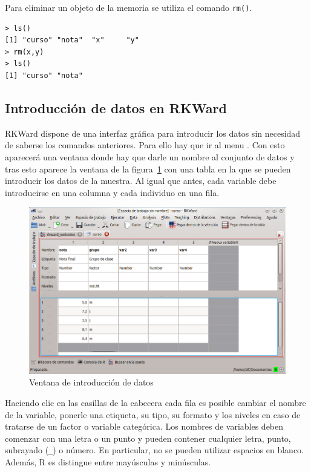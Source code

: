 Para eliminar un objeto de la memoria se utiliza el comando \lstinline{rm()}.
\begin{lstlisting}
> ls()
[1] "curso" "nota"  "x"     "y"    
> rm(x,y)
> ls()
[1] "curso" "nota"
\end{lstlisting}


\subsection{Introducción de datos en RKWard}
RKWard dispone de una interfaz gráfica para introducir los datos sin necesidad de saberse los comandos anteriores.
Para ello hay que ir al menu . Con esto
aparecerá una ventana donde hay que darle un nombre al conjunto de datos y tras esto aparece la ventana de la
figura~\ref{g:matriz_datos} con una tabla en la que se pueden introducir los datos de la muestra.
Al igual que antes, cada variable debe introducirse en una columna y cada individuo en una fila.

\begin{figure}[htp]
\begin{center}
  \includegraphics[scale=0.6]{introduccion_r/img/matriz_datos}
  \caption{Ventana de introducción de datos}
  \label{g:matriz_datos}
\end{center}
\end{figure}

Haciendo clic en las casillas de la cabecera cada fila es posible cambiar el nombre de la variable, ponerle una
etiqueta, su tipo, su formato y los niveles en caso de tratarse de un factor o variable categórica.
Los nombres de variables deben comenzar con una letra o un punto y pueden contener cualquier letra, punto, subrayado
(\lstinline{_}) o número.
En particular, no se pueden utilizar espacios en blanco.
Además, R es distingue entre mayúsculas y minúsculas.

